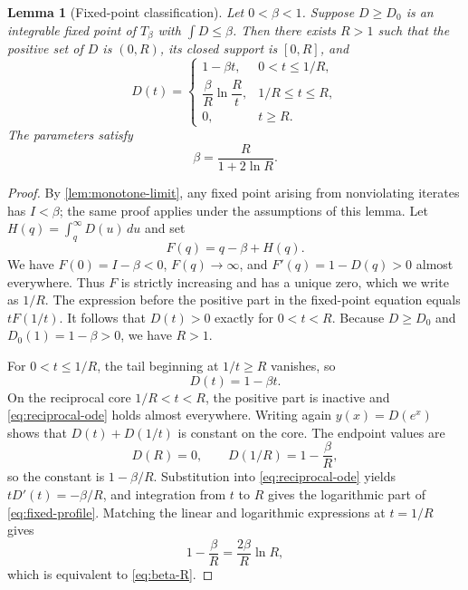 \documentclass[11pt,letterpaper]{article}
\newcommand{\cref}[1]{\autoref{#1}}
\newtheorem{lemma}[theorem]{Lemma}
\theoremstyle{definition}
\theoremstyle{remark}
\begin{document}
\begin{lemma}[Fixed-point classification]\label{lem:classification}
Let $0<\beta<1$.
Suppose $D\ge D_0$ is an integrable fixed point of $T_{\beta}$ with $\int D\le\beta$.
Then there exists $R>1$ such that the positive set of $D$ is $(0,R)$, its closed support is $[0,R]$, and
\begin{equation}\label{eq:fixed-profile} D(t)=\begin{cases} 1-\beta t, & 0<t\le1/R,\\[2mm] \dfrac{\beta}{R}\ln\dfrac{R}{t}, & 1/R\le t\le R,\\[2mm] 0, & t\ge R. \end{cases} \end{equation}
The parameters satisfy
\begin{equation}\label{eq:beta-R} \beta=\frac{R}{1+2\ln R}. \end{equation}
\end{lemma}

\begin{proof}
By \cref{lem:monotone-limit}, any fixed point arising from nonviolating iterates has $I<\beta$; the same proof applies under the assumptions of this lemma.
Let $H(q)=\int_q^{\infty}D(u)\,du$ and set
\begin{equation}\label{eq:F-general} F(q)=q-\beta+H(q). \end{equation}
We have $F(0)=I-\beta<0$, $F(q)\to\infty$, and $F'(q)=1-D(q)>0$ almost everywhere.
Thus $F$ is strictly increasing and has a unique zero, which we write as $1/R$.
The expression before the positive part in the fixed-point equation equals $tF(1/t)$.
It follows that $D(t)>0$ exactly for $0<t<R$.
Because $D\ge D_0$ and $D_0(1)=1-\beta>0$, we have $R>1$.

For $0<t\le1/R$, the tail beginning at $1/t\ge R$ vanishes, so
\begin{equation}\label{eq:outer-linear} D(t)=1-\beta t. \end{equation}
On the reciprocal core $1/R<t<R$, the positive part is inactive and \cref{eq:reciprocal-ode} holds almost everywhere.
Writing again $y(x)=D(e^x)$ shows that $D(t)+D(1/t)$ is constant on the core.
The endpoint values are
\begin{equation}\label{eq:endpoint-values} D(R)=0,\qquad D(1/R)=1-\frac{\beta}{R}, \end{equation}
so the constant is $1-\beta/R$.
Substitution into \cref{eq:reciprocal-ode} yields $tD'(t)=-\beta/R$, and integration from $t$ to $R$ gives the logarithmic part of \cref{eq:fixed-profile}.
Matching the linear and logarithmic expressions at $t=1/R$ gives
\begin{equation}\label{eq:matching} 1-\frac{\beta}{R}=\frac{2\beta}{R}\ln R, \end{equation}
which is equivalent to \cref{eq:beta-R}.
\end{proof}
\end{document}
